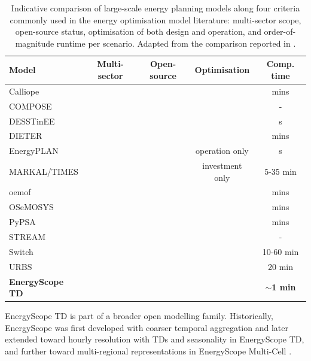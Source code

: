 \documentclass{article}
\newcommand{\cmark}{\ding{51}}
\newcommand{\xmark}{\ding{55}}
\begin{document}
\begin{table}[t]
  \centering
  \renewcommand{\arraystretch}{1.15}
  \begin{tabularx}{\linewidth}{lcccc}
    \toprule
    \textbf{Model} & \textbf{Multi-sector} & \textbf{Open-source} & \textbf{Optimisation} & \textbf{Comp. time} \\
    \midrule
    Calliope        & \cmark & \cmark & \cmark & mins \\
    COMPOSE         & \cmark & \xmark & \cmark & - \\
    DESSTinEE       & \cmark & \cmark & \xmark & s \\
    DIETER          & \xmark & \cmark & \cmark & mins \\
    EnergyPLAN      & \cmark & \xmark & operation only  & s \\
    MARKAL/TIMES    & \cmark & \xmark & investment only & 5-35 min \\
    oemof           & \cmark & \cmark & \cmark & mins \\
    OSeMOSYS        & \cmark & \cmark & \cmark & mins \\
    PyPSA           & \cmark & \cmark & \cmark & mins \\
    STREAM          & \cmark & \xmark & \xmark & - \\
    Switch          & \xmark & \cmark & \cmark & 10-60 min \\
    URBS            & \xmark & \cmark & \cmark & 20 min \\
    \addlinespace
    \textbf{EnergyScope TD} & \textbf{\cmark} & \textbf{\cmark} & \textbf{\cmark} & \textbf{$\sim$1 min} \\
    \bottomrule
  \end{tabularx}
  \caption{Indicative comparison of large-scale energy planning models along four criteria commonly used in the energy optimisation model literature: multi-sector scope, open-source status, optimisation of both design and operation, and order-of-magnitude runtime per scenario. Adapted from the comparison reported in \citet{limpensEnergyScopeTDNovel2019}.}
  \label{tab:model-comparison}
\end{table}

EnergyScope TD is part of a broader open modelling family. Historically, EnergyScope was first developed with coarser temporal aggregation and later extended toward hourly resolution with TDs and seasonality in EnergyScope TD, and further toward multi-regional representations in EnergyScope Multi-Cell \citep{hernandezEnergyScopeMultiCellNovel2021,thiranExploringOptionsFossilfree2025,borasioDeepDecarbonisationRegional2022}.
\end{document}
